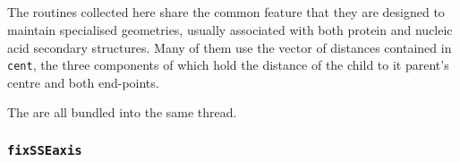 \subsection{}

The routines collected here share the common feature that they are designed to
maintain specialised geometries, usually associated with both protein and nucleic acid
secondary structures.   Many of them use the vector of distances contained in {\tt cent},
the three components of which hold the distance of the child to it parent's centre and
both end-points.

The  are all bundled into the same thread.

\subsubsection{{\tt fixSSEaxis}}

